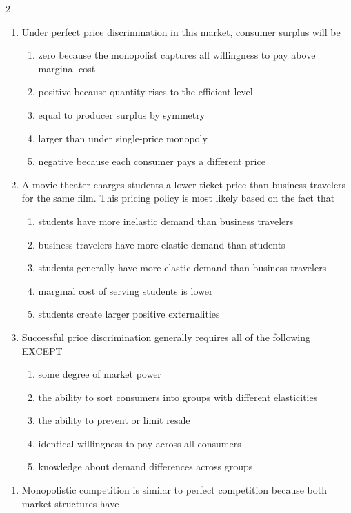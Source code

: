 \documentclass[10pt]{article}
\newenvironment{choiceslist}
  {\begin{enumerate}[label=(\Alph*), leftmargin=1.6em, itemsep=0.12em, topsep=0.18em, parsep=0pt]}
  {\end{enumerate}}
\begin{document}
\begin{multicols*}{2}
\begin{enumerate}[resume*=apq, leftmargin=*, itemsep=0.85em, topsep=0.2em, parsep=0pt]
\begin{choiceslist}
\item raise price for every unit sold
\end{choiceslist}
\item Under perfect price discrimination in this market, consumer surplus will be
\begin{choiceslist}
\item zero because the monopolist captures all willingness to pay above marginal cost
\item positive because quantity rises to the efficient level
\item equal to producer surplus by symmetry
\item larger than under single-price monopoly
\item negative because each consumer pays a different price
\end{choiceslist}
\item A movie theater charges students a lower ticket price than business travelers for the same film. This pricing policy is most likely based on the fact that
\begin{choiceslist}
\item students have more inelastic demand than business travelers
\item business travelers have more elastic demand than students
\item students generally have more elastic demand than business travelers
\item marginal cost of serving students is lower
\item students create larger positive externalities
\end{choiceslist}
\item Successful price discrimination generally requires all of the following EXCEPT
\begin{choiceslist}
\item some degree of market power
\item the ability to sort consumers into groups with different elasticities
\item the ability to prevent or limit resale
\item identical willingness to pay across all consumers
\item knowledge about demand differences across groups
\end{choiceslist}
\end{enumerate}
\begin{enumerate}[resume*=apq, leftmargin=*, itemsep=0.85em, topsep=0.2em, parsep=0pt]
\item Monopolistic competition is similar to perfect competition because both market structures have

\end{enumerate}
\end{multicols*}
\end{document}
